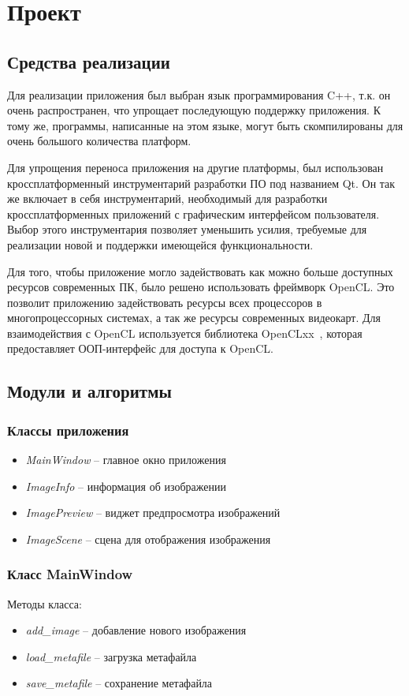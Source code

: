 \section{Проект}
\subsection{Средства реализации}
Для реализации приложения был выбран язык программирования C++, т.к. он очень распространен, что упрощает последующую поддержку приложения. К тому же, программы, написанные на этом языке, могут быть скомпилированы для очень большого количества платформ.

Для упрощения переноса приложения на другие платформы, был использован кроссплатформенный инструментарий разработки ПО под названием Qt. Он так же включает в себя инструментарий, необходимый для разработки кроссплатформенных приложений с графическим интерфейсом пользователя. Выбор этого инструментария позволяет уменьшить усилия, требуемые для реализации новой и поддержки имеющейся функциональности.

Для того, чтобы приложение могло задействовать как можно больше доступных ресурсов современных ПК, было решено использовать фреймворк OpenCL. Это позволит приложению задействовать ресурсы всех процессоров в многопроцессорных системах, а так же ресурсы современных видеокарт.
Для взаимодействия с OpenCL используется библиотека OpenCLxx~\cite{opencl_openclxx}, которая предоставляет ООП-интерфейс для доступа к OpenCL.

\subsection{Модули и алгоритмы}

\subsubsection{Классы приложения}
\begin{itemize}
\item \textit{MainWindow} -- главное окно приложения
\item \textit{ImageInfo} -- информация об изображении
\item \textit{ImagePreview} -- виджет предпросмотра изображений
\item \textit{ImageScene} -- сцена для отображения изображения
\end{itemize}

\subsubsection{Класс MainWindow}
Методы класса:
\begin{itemize}
\item \textit{add\_image} -- добавление нового изображения
\item \textit{load\_metafile} -- загрузка метафайла
\item \textit{save\_metafile} -- сохранение метафайла
\end{itemize}

